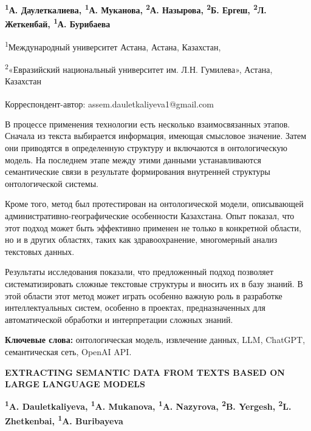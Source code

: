 
\begin{articleheader}

{\bfseries
\textsuperscript{1}А. Даулеткалиева\textsuperscript{\envelope },
\textsuperscript{1}А. Муканова,
\textsuperscript{2}А. Назырова,
\textsuperscript{2}Б. Ергеш,
\textsuperscript{2}Л. Жеткенбай,
\textsuperscript{1}А. Бурибаева
}
\end{articleheader}

\begin{affiliation}
\textsuperscript{1}Международный университет Астана, Астана, Казахстан,

\textsuperscript{2}«Евразийский национальный университет им. Л.Н. Гумилева», Астана, Казахстан

\raggedright \textsuperscript{\envelope }Корреспондент-автор: assem.dauletkaliyeva1@gmail.com
\end{affiliation}

В процессе применения технологии есть несколько взаимосвязанных этапов.
Сначала из текста выбирается информация, имеющая смысловое значение.
Затем они приводятся в определенную структуру и включаются в
онтологическую модель. На последнем этапе между этими данными
устанавливаются семантические связи в результате формирования внутренней
структуры онтологической системы.

Кроме того, метод был протестирован на онтологической модели,
описывающей административно-географические особенности Казахстана. Опыт
показал, что этот подход может быть эффективно применен не только в
конкретной области, но и в других областях, таких как здравоохранение,
многомерный анализ текстовых данных.

Результаты исследования показали, что предложенный подход позволяет
систематизировать сложные текстовые структуры и вносить их в базу
знаний. В этой области этот метод может играть особенно важную роль в
разработке интеллектуальных систем, особенно в проектах, предназначенных
для автоматической обработки и интерпретации сложных знаний.

{\bfseries Ключевые слова:} онтологическая модель, извлечение данных, LLM,
ChatGPT, семантическая сеть, OpenAI API.

\begin{articleheader}
{\bfseries EXTRACTING SEMANTIC DATA FROM TEXTS BASED ON LARGE LANGUAGE MODELS}

{\bfseries
\textsuperscript{1}A. Dauletkaliyeva\textsuperscript{\envelope },
\textsuperscript{1}A. Mukanova,
\textsuperscript{1}A. Nazyrova,
\textsuperscript{2}B. Yergesh,
\textsuperscript{2}L. Zhetkenbai,
\textsuperscript{1}A. Buribayeva
}
\end{articleheader}

